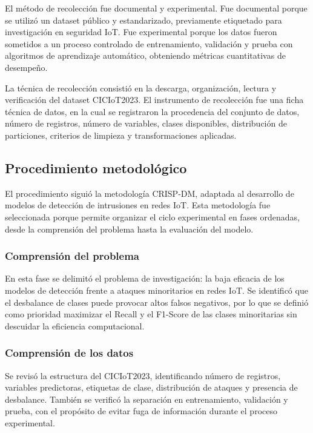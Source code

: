 \documentclass[12pt,a4paper]{article}
\begin{document}
El método de recolección fue documental y experimental. Fue documental porque se utilizó un dataset público y estandarizado, previamente etiquetado para investigación en seguridad IoT. Fue experimental porque los datos fueron sometidos a un proceso controlado de entrenamiento, validación y prueba con algoritmos de aprendizaje automático, obteniendo métricas cuantitativas de desempeño.

La técnica de recolección consistió en la descarga, organización, lectura y verificación del dataset CICIoT2023. El instrumento de recolección fue una ficha técnica de datos, en la cual se registraron la procedencia del conjunto de datos, número de registros, número de variables, clases disponibles, distribución de particiones, criterios de limpieza y transformaciones aplicadas.

\subsection{Procedimiento metodológico}

El procedimiento siguió la metodología CRISP-DM, adaptada al desarrollo de modelos de detección de intrusiones en redes IoT. Esta metodología fue seleccionada porque permite organizar el ciclo experimental en fases ordenadas, desde la comprensión del problema hasta la evaluación del modelo.

\subsubsection{Comprensión del problema}

En esta fase se delimitó el problema de investigación: la baja eficacia de los modelos de detección frente a ataques minoritarios en redes IoT. Se identificó que el desbalance de clases puede provocar altos falsos negativos, por lo que se definió como prioridad maximizar el Recall y el F1-Score de las clases minoritarias sin descuidar la eficiencia computacional.

\subsubsection{Comprensión de los datos}

Se revisó la estructura del CICIoT2023, identificando número de registros, variables predictoras, etiquetas de clase, distribución de ataques y presencia de desbalance. También se verificó la separación en entrenamiento, validación y prueba, con el propósito de evitar fuga de información durante el proceso experimental.
\end{document}
